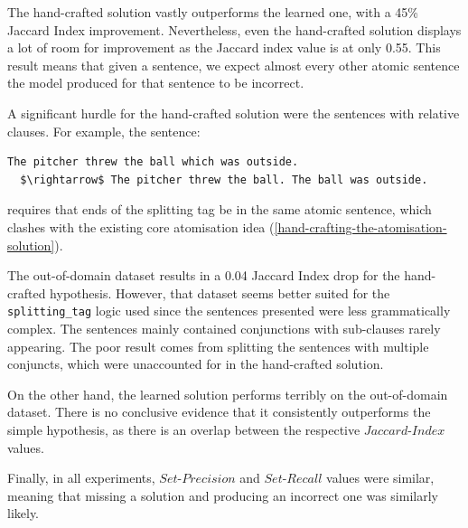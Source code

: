 The hand-crafted solution vastly outperforms the learned one, with a 45\% Jaccard Index improvement.
Nevertheless, even the hand-crafted solution displays a lot of room for improvement as the Jaccard index value is at only 0.55.
This result means that given a sentence, we expect almost every other atomic sentence the model produced for that sentence to be incorrect.

A significant hurdle for the hand-crafted solution were the sentences with relative clauses. 
For example, the sentence:
\begin{lstlisting}
The pitcher threw the ball which was outside. 
  $\rightarrow$ The pitcher threw the ball. The ball was outside.
\end{lstlisting}
requires that ends of the splitting tag be in the same atomic sentence, which clashes with the existing core atomisation idea (\ref{hand-crafting-the-atomisation-solution}).


The out-of-domain dataset results in a 0.04 Jaccard Index drop for the hand-crafted hypothesis.
However, that dataset seems better suited for the \verb+splitting_tag+ logic used since the sentences presented were less grammatically complex.
The sentences mainly contained conjunctions with sub-clauses rarely appearing.
The poor result comes from splitting the sentences with multiple conjuncts, which were unaccounted for in the hand-crafted solution.

On the other hand, the learned solution performs terribly on the out-of-domain dataset.
There is no conclusive evidence that it consistently outperforms the simple hypothesis, as there is an overlap between the respective $Jaccard$-$Index$ values.

Finally, in all experiments, $Set$-$Precision$ and $Set$-$Recall$ values were similar, meaning that missing a solution and producing an incorrect one was similarly likely.

